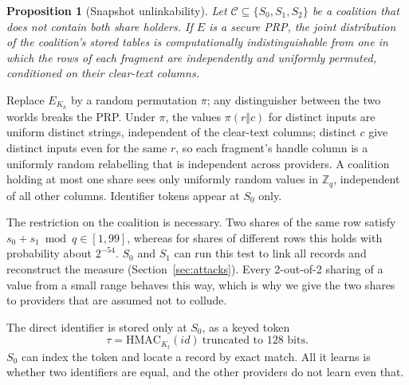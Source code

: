 \documentclass[conference]{IEEEtran}
\newtheorem{proposition}{Proposition}
\begin{document}
\begin{proposition}[Snapshot unlinkability]
Let $\mathcal{C}\subseteq\{S_0,S_1,S_2\}$ be a coalition that does not contain both share holders. If $E$ is a secure PRP, the joint distribution of the coalition's stored tables is computationally indistinguishable from one in which the rows of each fragment are independently and uniformly permuted, conditioned on their clear-text columns.
\end{proposition}
\begin{IEEEproof}
Replace $E_{K_h}$ by a random permutation $\pi$; any distinguisher between the two worlds breaks the PRP. Under $\pi$, the values $\pi(r\Vert c)$ for distinct inputs are uniform distinct strings, independent of the clear-text columns; distinct $c$ give distinct inputs even for the same $r$, so each fragment's handle column is a uniformly random relabelling that is independent across providers. A coalition holding at most one share sees only uniformly random values in $\mathbb{Z}_q$, independent of all other columns. Identifier tokens appear at $S_0$ only.
\end{IEEEproof}
The restriction on the coalition is necessary. Two shares of the same row satisfy $s_0+s_1 \bmod q\in[1,99]$, whereas for shares of different rows this holds with probability about $2^{-54}$. $S_0$ and $S_1$ can run this test to link all records and reconstruct the measure (Section~\ref{sec:attacks}). Every 2-out-of-2 sharing of a value from a small range behaves this way, which is why we give the two shares to providers that are assumed not to collude.

The direct identifier is stored only at $S_0$, as a keyed token \cite{rfc2104}
\begin{equation}
  \tau = \mathrm{HMAC}_{K_t}(\mathit{id})\ \text{truncated to 128 bits}.
  \label{eq:token}
\end{equation}
$S_0$ can index the token and locate a record by exact match. All it learns is whether two identifiers are equal, and the other providers do not learn even that.
\end{document}

